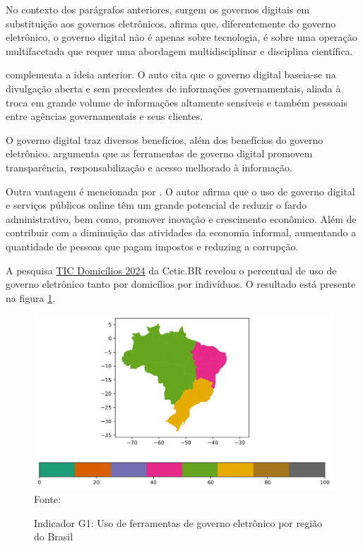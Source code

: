 No contexto dos parágrafos anteriores, surgem os governos digitais em substituição aos governos eletrônicos. \cite{veiga2016digital} afirma que, diferentemente do governo eletrônico, o governo digital não é apenas sobre tecnologia, é sobre uma operação multifacetada  que requer uma abordagem multidisciplinar e disciplina científica. 

\cite{bounabat2017government} complementa a ideia anterior. O auto cita que o governo digital baseia-se na divulgação aberta e sem precedentes de informações governamentais, aliada à troca em grande volume de informações altamente sensíveis e também pessoais entre agências governamentais e seus clientes. 

O governo digital traz diversos benefícios, além dos benefícios do governo eletrônico. \cite{martins2018war} argumenta que as ferramentas de governo digital promovem transparência, responsabilização e acesso melhorado à informação.

Outra vantagem é mencionada por \cite{veiga2016digital}. O autor afirma que o uso de governo digital e serviços públicos online têm um grande potencial de reduzir o fardo administrativo, bem como, promover inovação e crescimento econômico. Além de contribuir com a diminuição das atividades da economia informal, aumentando a quantidade de pessoas que pagam impostos e reduzing a corrupção.

A pesquisa \href{https://cetic.br/pt/pesquisa/domicilios/}{TIC Domicílios 2024} da Cetic.BR revelou o percentual de uso de governo eletrônico tanto por domicílios por indivíduos. O resultado está presente na figura \ref{fig:mapa_coropleto_tic_domicilio_g1}.

\begin{figure}[H]
	\centering
	\caption{Indicador G1: Uso de ferramentas de governo eletrônico por região do Brasil}
	\includegraphics[width=1\linewidth]{figuras/mapa_coropleto_tic_domicilio_g1}
	\label{fig:mapa_coropleto_tic_domicilio_g1}
	\footnotesize{Fonte: \cite{tic_domicilios_2024_g1}}
\end{figure}

